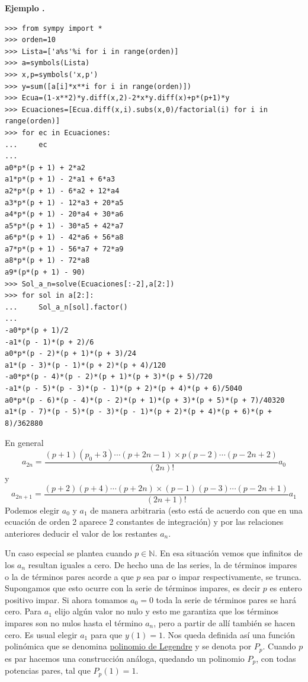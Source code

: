 \documentclass{article}
\newcounter{ejemplo_cont}
\newenvironment{ejemplo}{\noindent\textbf{Ejemplo  \arabic{ejemplo_cont}.} }{\addtocounter{ejemplo_cont}{1}}
\begin{document}
\begin{ejemplo}
\begin{lstlisting}
>>> from sympy import *
>>> orden=10
>>> Lista=['a%s'%i for i in range(orden)]
>>> a=symbols(Lista)
>>> x,p=symbols('x,p')
>>> y=sum([a[i]*x**i for i in range(orden)])
>>> Ecua=(1-x**2)*y.diff(x,2)-2*x*y.diff(x)+p*(p+1)*y
>>> Ecuaciones=[Ecua.diff(x,i).subs(x,0)/factorial(i) for i in range(orden)]
>>> for ec in Ecuaciones:
...     ec
... 
a0*p*(p + 1) + 2*a2
a1*p*(p + 1) - 2*a1 + 6*a3
a2*p*(p + 1) - 6*a2 + 12*a4
a3*p*(p + 1) - 12*a3 + 20*a5
a4*p*(p + 1) - 20*a4 + 30*a6
a5*p*(p + 1) - 30*a5 + 42*a7
a6*p*(p + 1) - 42*a6 + 56*a8
a7*p*(p + 1) - 56*a7 + 72*a9
a8*p*(p + 1) - 72*a8
a9*(p*(p + 1) - 90)
>>> Sol_a_n=solve(Ecuaciones[:-2],a[2:])
>>> for sol in a[2:]:
...     Sol_a_n[sol].factor()
... 
-a0*p*(p + 1)/2
-a1*(p - 1)*(p + 2)/6
a0*p*(p - 2)*(p + 1)*(p + 3)/24
a1*(p - 3)*(p - 1)*(p + 2)*(p + 4)/120
-a0*p*(p - 4)*(p - 2)*(p + 1)*(p + 3)*(p + 5)/720
-a1*(p - 5)*(p - 3)*(p - 1)*(p + 2)*(p + 4)*(p + 6)/5040
a0*p*(p - 6)*(p - 4)*(p - 2)*(p + 1)*(p + 3)*(p + 5)*(p + 7)/40320
a1*(p - 7)*(p - 5)*(p - 3)*(p - 1)*(p + 2)*(p + 4)*(p + 6)*(p + 8)/362880

\end{lstlisting}





En general 
\[a_{2n}=\frac{(p+1)(p_0+3)\cdots (p+2n-1) \times p(p-2)\cdots (p-2n+2)}{(2n)!}a_0\]
y
\[a_{2n+1}=\frac{(p+2)(p+4)\cdots (p+2n) \times (p-1)(p-3)\cdots (p-2n+1)}{(2n+1)!}a_1\]
Podemos elegir $a_0$ y $a_1$ de manera arbitraria (esto está de acuerdo con que en una ecuación de orden 2 aparece 2 constantes de integración) y por las relaciones anteriores deducir el valor de los restantes $a_n$.

Un caso especial se plantea cuando  $p\in\mathbb{N}$. En esa situación vemos que infinitos de los $a_n$ resultan iguales a cero. De hecho una de las series, la de términos impares o la de términos pares acorde a que $p$ sea par o impar respectivamente,  se trunca. Supongamos que esto ocurre con la serie de términos impares, es decir $p$ es entero positivo impar. Si ahora tomamos $a_0=0$ toda la serie de términos pares se hará cero. Para $a_1$ elijo algún valor no nulo y esto me garantiza que los términos impares son no nulos hasta el término $a_{n}$, pero a partir de allí también se hacen cero. Es usual elegir $a_1$ para que $y(1)=1$. Nos queda definida así una función polinómica que se denomina \href{http://es.wikipedia.org/wiki/Polinomios_de_Legendre}{polinomio de Legendre} y se denota por $P_p$. Cuando $p$ es par hacemos una construcción análoga, quedando un polinomio $P_p$, con todas potencias pares, tal que $P_p(1)=1$.


\end{ejemplo}
\end{document}

